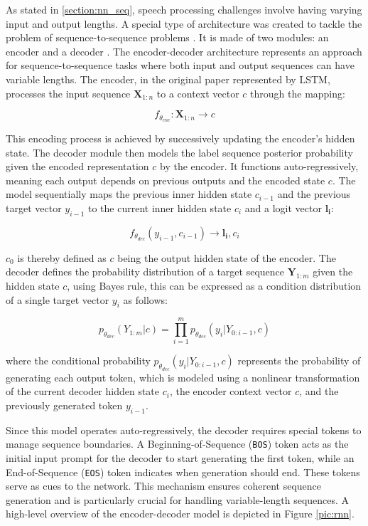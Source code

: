 As stated in \ref{section:nn_seq}, speech processing challenges involve having varying input and output lengths. A special type of architecture was created to tackle the problem of sequence-to-sequence problems \cite{sutskever2014sequencesequencelearningneural}. It is made of two modules: an encoder and a decoder \cite{cho2014learningphraserepresentationsusing}. The encoder-decoder architecture represents an approach for sequence-to-sequence tasks where both input and output sequences can have variable lengths. The encoder, in the original paper represented by LSTM, processes the input sequence $\mathbf{X}_{1:n}$ to a context vector $c$ through the mapping:

\begin{equation}
f_{\theta_{enc}}: \mathbf{X}_{1:n} \rightarrow c
\end{equation}

This encoding process is achieved by successively updating the encoder's hidden state. The decoder module then models the label sequence posterior probability given the encoded representation $c$ by the encoder. It functions auto-regressively, meaning each output depends on previous outputs and the encoded state $c$. The model sequentially maps the previous inner hidden state $c_{i-1}$ and the previous target vector $y_{i-1}$ to the current inner hidden state $c_i$ and a logit vector $\mathbf{l_i}$:

\begin{equation}
f_{\theta_{dec}}(y_{i-1}, c_{i-1}) \rightarrow \mathbf{l_i}, c_i
\end{equation}

$c_0$ is thereby defined as $c$ being the output hidden state of the encoder. The decoder defines the probability distribution of a target sequence $\mathbf{Y}_{1:m}$ given the hidden state $c$, using Bayes rule, this can be expressed as a condition distribution of a single target vector $y_i$ as follows:

\begin{equation}
p_{\theta_{dec}}(Y_{1:m}|c) = \prod_{i=1}^m p_{\theta_{dec}}(y_i|Y_{0:i-1},c)
\end{equation}

where the conditional probability $p_{\theta_{dec}}(y_i|Y_{0:i-1},c)$ represents the probability of generating each output token, which is modeled using a nonlinear transformation of the current decoder hidden state $c_i$, the encoder context vector $c$, and the previously generated token $y_{i-1}$.


Since this model operates auto-regressively, the decoder requires special tokens to manage sequence boundaries. A Beginning-of-Sequence (\texttt{BOS}) token acts as the initial input prompt for the decoder to start generating the first token, while an End-of-Sequence (\texttt{EOS}) token indicates when generation should end. These tokens serve as cues to the network. This mechanism ensures coherent sequence generation and is particularly crucial for handling variable-length sequences. A high-level overview of the encoder-decoder model is depicted in Figure \ref{pic:rnn}. \newline

